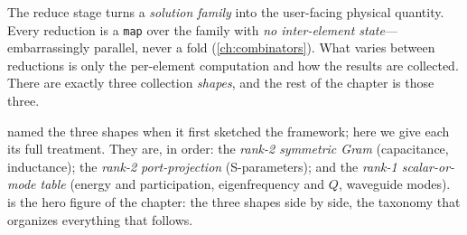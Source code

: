 \begin{keyidea}
The reduce stage turns a \emph{solution family} into the user-facing physical
quantity. Every reduction is a \texttt{map} over the family with \emph{no
inter-element state}---embarrassingly parallel, never a fold
(\cref{ch:combinators}). What varies between reductions is only the per-element
computation and how the results are collected. There are exactly three
collection \emph{shapes}, and the rest of the chapter is those three.
\end{keyidea}

 named the three shapes when it first sketched the framework;
here we give each its full treatment. They are, in order: the \emph{rank-2
symmetric Gram} (capacitance, inductance); the \emph{rank-2 port-projection}
(S-parameters); and the \emph{rank-1 scalar-or-mode table} (energy and
participation, eigenfrequency and $Q$, waveguide modes). 
is the hero figure of the chapter: the three shapes side by side, the taxonomy
that organizes everything that follows.

